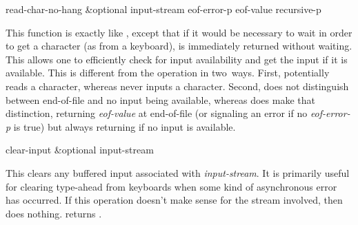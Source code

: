 \begin{defun}[Function]
read-char-no-hang &optional input-stream eof-error-p eof-value recursive-p

This function is exactly like , except
that if it would be necessary to wait in order to get a character (as
from a keyboard), {\false} is immediately returned without waiting.  This
allows one to efficiently check for input availability and get the
input if it is available.
This is different from the  operation in
two~ways.  First,  potentially reads a character,
whereas  never inputs a character.  Second,
 does not distinguish between end-of-file and no input being
available, whereas  does make that distinction, returning
{\it eof-value} at end-of-file (or signaling an error if no {\it eof-error-p}
is true) but always returning {\false} if no input
is available.
\end{defun}

\begin{defun}[Function]
clear-input &optional input-stream

This clears any buffered input associated with {\it input-stream}.
It is primarily useful for clearing type-ahead from keyboards when
some kind of asynchronous error has occurred.  If this operation
doesn't make sense for the stream involved, then 
does nothing.   returns {\false}.
\end{defun}

